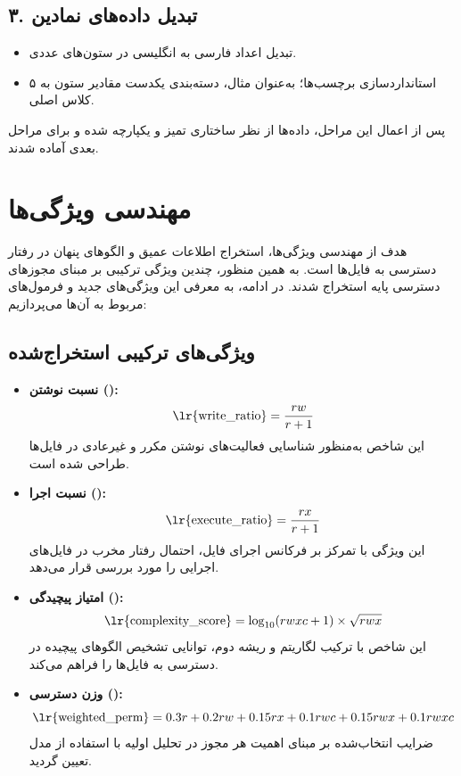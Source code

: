 \subsection{۳. تبدیل داده‌های نمادین}
\begin{itemize}
    \item تبدیل اعداد فارسی به انگلیسی در ستون‌های عددی.
    \item استانداردسازی برچسب‌ها؛ به‌عنوان مثال، دسته‌بندی یکدست مقادیر ستون  به ۵ کلاس اصلی.
\end{itemize}

پس از اعمال این مراحل، داده‌ها از نظر ساختاری تمیز و یکپارچه شده و برای مراحل بعدی آماده شدند.

\section{مهندسی ویژگی‌ها} هدف از مهندسی ویژگی‌ها، استخراج اطلاعات عمیق و الگوهای پنهان در رفتار دسترسی به فایل‌ها است. به همین منظور، چندین ویژگی ترکیبی بر مبنای مجوزهای دسترسی پایه استخراج شدند. در ادامه، به معرفی این ویژگی‌های جدید و فرمول‌های مربوط به آن‌ها می‌پردازیم:

\subsection{ویژگی‌های ترکیبی استخراج‌شده}
\begin{itemize}
    \item \textbf{نسبت نوشتن ():}
    \begin{equation}
        \text{\lr{write\_ratio}} = \frac{rw}{r+1}
    \end{equation}
    این شاخص به‌منظور شناسایی فعالیت‌های نوشتن مکرر و غیرعادی در فایل‌ها طراحی شده است.

    \item \textbf{نسبت اجرا ():}
    \begin{equation}
        \text{\lr{execute\_ratio}} = \frac{rx}{r+1}
    \end{equation}
    این ویژگی با تمرکز بر فرکانس اجرای فایل، احتمال رفتار مخرب در فایل‌های اجرایی را مورد بررسی قرار می‌دهد.

    \item \textbf{امتیاز پیچیدگی ():}
    \begin{equation}
        \text{\lr{complexity\_score}} = \log_{10}(rwxc+1) \times \sqrt{rwx}
    \end{equation}
    این شاخص با ترکیب لگاریتم و ریشه دوم، توانایی تشخیص الگوهای پیچیده در دسترسی به فایل‌ها را فراهم می‌کند.

    \item \textbf{وزن دسترسی ():}
    \begin{equation}
        \text{\lr{weighted\_perm}} = 0.3r + 0.2rw + 0.15rx + 0.1rwc + 0.15rwx + 0.1rwxc
    \end{equation}
    ضرایب انتخاب‌شده بر مبنای اهمیت هر مجوز در تحلیل اولیه با استفاده از مدل  تعیین گردید.
\end{itemize}

